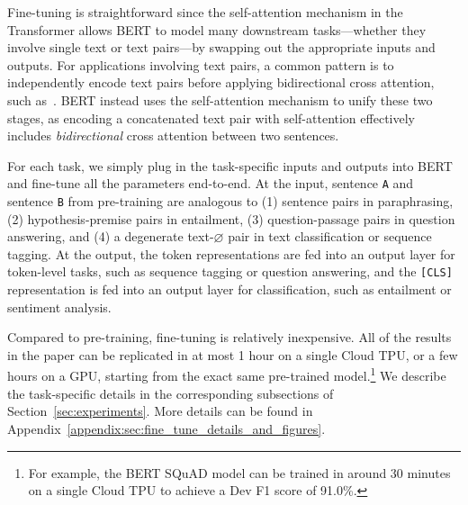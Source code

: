 \documentclass[11pt,a4paper]{article}
\begin{document}
Fine-tuning is straightforward since the self-attention mechanism in the Transformer allows BERT to model many downstream tasks---whether they involve single text or text pairs---by swapping out the appropriate inputs and outputs.
For applications involving text pairs, a common pattern is to independently encode text pairs before applying bidirectional cross attention, such as~. BERT instead uses the self-attention mechanism to unify these two stages, as encoding 
a concatenated text pair with self-attention effectively includes \emph{bidirectional} cross attention between two sentences. 

For each task, we simply plug in the task-specific inputs and outputs into BERT and fine-tune all the parameters end-to-end. 
At the input, sentence {\tt A} and sentence {\tt B} from pre-training are analogous to (1) sentence pairs in paraphrasing, (2) hypothesis-premise pairs in entailment, (3) question-passage pairs in question answering, and (4) a degenerate text-$\varnothing$ pair in text classification or sequence tagging. At the output, the token representations are fed into an output layer for token-level tasks, such as sequence tagging or question answering, and the {\tt [CLS]} representation is fed into an output layer for classification, such as entailment or sentiment analysis.

Compared to pre-training, fine-tuning is relatively inexpensive. All of the results in the paper can be replicated in at most 1 hour on a single Cloud TPU, or a few hours on a GPU, starting from the exact same pre-trained model.\footnote{For example, the BERT SQuAD model can be trained in around 30 minutes on a single Cloud TPU to achieve a Dev F1 score of 91.0\%.}
We describe the task-specific details in the corresponding subsections of Section~\ref{sec:experiments}. 
More details can be found in Appendix~\ref{appendix:sec:fine_tune_details_and_figures}.
\end{document}
